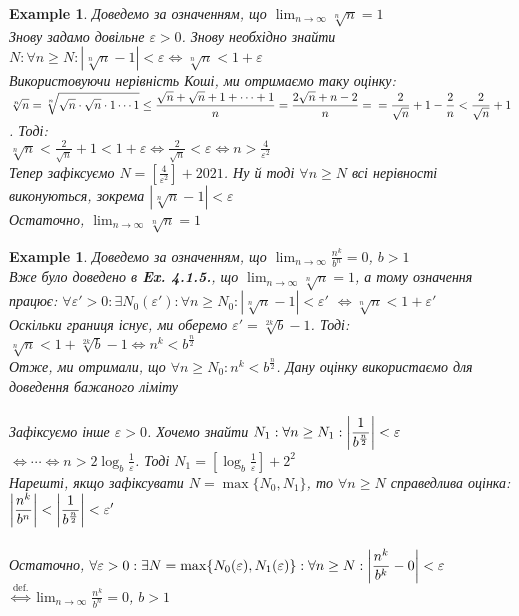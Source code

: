 \documentclass[a4paper, 14pt]{extarticle}
\theoremstyle{theoremdd}
\theoremstyle{theoremdd}
\theoremstyle{theoremdd}
\theoremstyle{theoremdd}
\newtheorem{example}[theorem]{Example}
\theoremstyle{theoremdd}
\theoremstyle{theoremdd}
\theoremstyle{theoremdd}
\theoremstyle{theoremdd}
\def\limitdef#1#2#3#4#5{$\displaystyle \forall #1 > 0: \exists #2(#1): \forall #3 \geq #2: \left|#4 - #5\right| < #1$}
\begin{document}
\begin{example}
Доведемо за означенням, що $\displaystyle\lim_{n \to \infty} \sqrt[n]{n}=1$\\
	Знову задамо довільне $\varepsilon > 0$. Знову необхідно знайти $\displaystyle N: \forall n \geq N: \left|\sqrt[n]{n}-1  \right|<\varepsilon \iff \sqrt[n]{n}<1+\varepsilon$\\
	Використовуючи нерівність Коші, ми отримаємо таку оцінку:\\
	$\displaystyle \sqrt[n]{n}= \sqrt[n]{\sqrt{n}\cdot\sqrt{n}\cdot 1 \cdots 1} \leq \frac{\sqrt{n}+\sqrt{n}+1+\cdots+1}{n} = \frac{2\sqrt{n}+n-2}{n} = \\ = \frac{2}{\sqrt{n}}+1-\frac{2}{n}<\frac{2}{\sqrt{n}}+1$. Тоді:\\
	$\displaystyle \sqrt[n]{n} < \frac{2}{\sqrt{n}} + 1 < 1 + \varepsilon \iff \frac{2}{\sqrt{n}} < \varepsilon \iff n > \frac{4}{\varepsilon^2}$\\
	Тепер зафіксуємо $\displaystyle N = \left[\frac{4}{\varepsilon^2} \right] + 2021$. Ну й тоді $\forall n \geq N$ всі нерівності виконуються, зокрема $\left|\sqrt[n]{n}-1  \right|<\varepsilon$\\
	Остаточно, $\displaystyle\lim_{n \to \infty} \sqrt[n]{n}=1$
\end{example}

\begin{example}
	Доведемо за означенням, що $\displaystyle\lim_{n \to \infty} \frac{n^k}{b^n} = 0$, $b>1$\\
	Вже було доведено в {\textbf{Ex. 4.1.5.}}, що $\displaystyle\lim_{n \to \infty} \sqrt[n]{n}=1$, а тому означення працює:
	\limitdef{\varepsilon'}{N_0}{n}{\sqrt[n]{n}}{1} $\iff \sqrt[n]{n}<1+\varepsilon'$\\
	Оскільки границя існує, ми оберемо $\displaystyle \varepsilon' = \sqrt[2k]{b}-1$. Тоді:\\
	$\displaystyle \sqrt[n]{n} < 1 + \sqrt[2k]{b}-1 \iff n^k < b^{\frac{n}{2}}$\\
	Отже, ми отримали, що $\forall n \geq N_0: n^k < b^{\frac{n}{2}}$. Дану оцінку використаємо для доведення бажаного ліміту\\
	\\
	Зафіксуємо інше $\varepsilon>0$. Хочемо знайти $N_1: \forall n \geq N_1: \displaystyle \abs{\frac{1}{b^{\frac{n}{2}}}} < \varepsilon$\\
	$\displaystyle \iff \cdots \iff n>2 \log_{b} \frac{1}{\varepsilon}$. Тоді $\displaystyle N_1 = \left[\log_{b} \frac{1}{\varepsilon} \right] + 2^2$\\
	Нарешті, якщо зафіксувати $N=\max\{N_0, N_1\}$, то $\forall n \geq N$ справедлива оцінка:\\
	$\displaystyle \abs{\frac{n^k}{b^n}} < \abs{\frac{1}{b^{\frac{n}{2}}}} < \varepsilon'$\\
	\\
	Остаточно, $\forall \varepsilon > 0: \exists N = \max\{N_0(\varepsilon), N_1(\varepsilon)\}: \forall n \geq N: \abs{\dfrac{n^k}{b^k} - 0} < \varepsilon$\\
	$\overset{\textrm{def.}}{\iff} \displaystyle\lim_{n \to \infty} \frac{n^k}{b^n} = 0$, $b>1$
\end{example}
\end{document}
